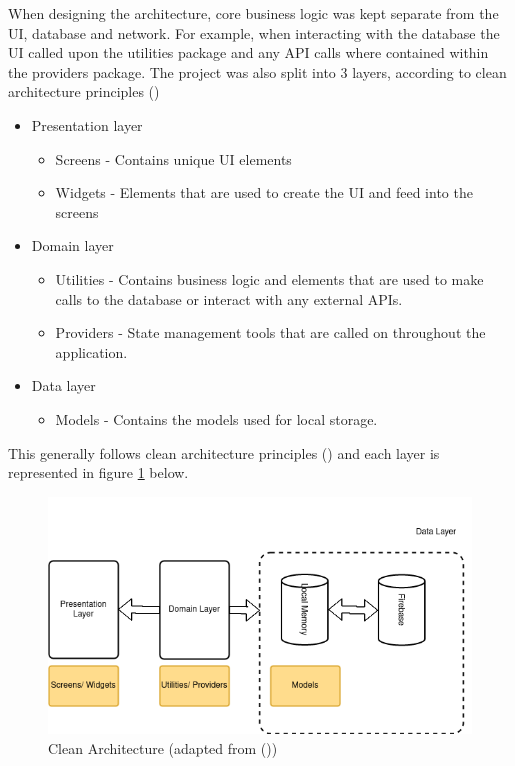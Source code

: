 \documentclass[12pt]{article}
\begin{document}
	When designing the architecture, core business logic was kept separate from the UI, database and network. For example, when interacting with the database the UI called upon the utilities package and any API calls where contained within the providers package. The project was also split into 3 layers, according to clean architecture principles (\cite{Martin, 2017})
	
	\begin{itemize}
		\item Presentation layer
		\begin{itemize}
			\item Screens - Contains unique UI elements
			\item Widgets - Elements that are used to create the UI and feed into the screens
		\end{itemize}
	\end{itemize}
	
	\begin{itemize}
		\item Domain layer
		\begin{itemize}
			\item Utilities - Contains business logic and elements that are used to make calls to the database or interact with any external APIs.
			\item Providers - State management tools that are called on throughout the application.
		\end{itemize}
	\end{itemize}
	
	\begin{itemize}
		\item Data layer
		\begin{itemize}
			\item Models - Contains the models used for local storage.
		\end{itemize}
	\end{itemize}

	 This generally follows clean architecture principles (\cite{Martin, 2017}) and each layer is represented in figure \ref{fig:clean-architecture} below.
	 
	 \begin{figure}[H]
	 	\centering
	 	\includegraphics[scale=0.7]{images/clean-architecture.png}
	 	\caption{Clean Architecture (adapted from (\cite{Martin, 2017}))}
	 	\label{fig:clean-architecture}
	 \end{figure}
	 
\end{document}
